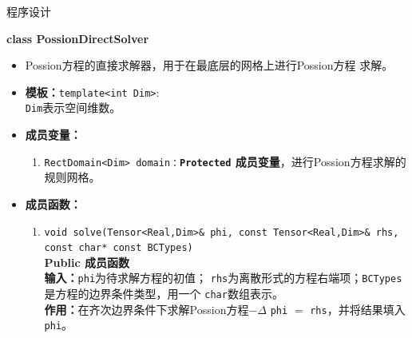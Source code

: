 \documentclass{beamer}
\begin{document}
\begin{frame}{程序设计}

\textbf{\large class PossionDirectSolver}
\begin{itemize}
    \item Possion方程的直接求解器，用于在最底层的网格上进行Possion方程
      求解。
    \item \textbf{模板：}\texttt{template<int Dim>}:\\
    \texttt{Dim}表示空间维数。
     \item \textbf{成员变量：}
        \begin{enumerate}[(1)]
            \item \texttt{RectDomain<Dim>
                domain：}\textbf{\texttt{Protected}  成员变量}，进行Possion方程求解的规则网格。
        \end{enumerate}
    \item \textbf{成员函数：}
        \begin{enumerate}[(1)]
                       \item \texttt{void solve(Tensor<Real,Dim>\& phi, const Tensor<Real,Dim>\&
                rhs, const char* const BCTypes)}\\
              \textbf{Public 成员函数}\\
            \textbf{输入：}\texttt{phi}为待求解方程的初值；
            \texttt{rhs}为离散形式的方程右端项；\texttt{BCTypes}是方程的边界条件类型，用一个
            \texttt{char}数组表示。\\
            \textbf{作用：}在齐次边界条件下求解Possion方程$-\Delta$ \texttt{phi} $=$
            \texttt{rhs}，并将结果填入\texttt{phi}。
        \end{enumerate}
\end{itemize}

\end{frame}
\end{document}
